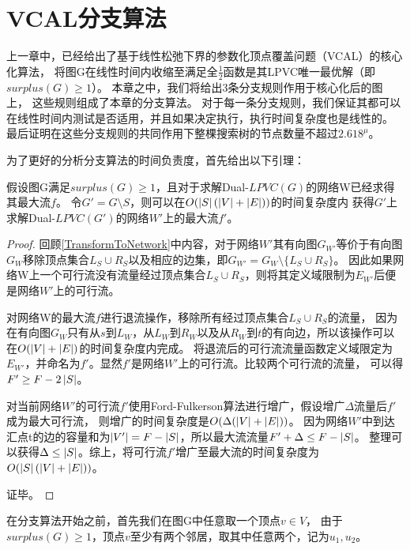 \section{VCAL分支算法}
上一章中，已经给出了基于线性松弛下界的参数化顶点覆盖问题（VCAL）的核心化算法，
将图G在线性时间内收缩至满足全$\frac{1}{2}$函数是其LPVC唯一最优解（即$surplus(G) \ge 1$）。
本章之中，我们将给出3条分支规则作用于核心化后的图上，
这些规则组成了本章的分支算法。
对于每一条分支规则，我们保证其都可以在线性时间内测试是否适用，并且如果决定执行，执行时间复杂度也是线性的。
最后证明在这些分支规则的共同作用下整棵搜索树的节点数量不超过$2.618^\mu$。

\vspace{0.5cm}
为了更好的分析分支算法的时间负责度，首先给出以下引理：
\begin{lemma} \label{LemmaUpdateMaxflow}
假设图G满足$surplus(G) \ge 1$，且对于求解Dual-$LPVC(G)$的网络W已经求得其最大流$f$。
令$G' = G \setminus S$，则可以在$O(\left\vert S \right\vert(\left\vert V \right\vert + \left\vert E \right\vert))$的时间复杂度内
获得$G'$上求解Dual-$LPVC(G')$的网络$W'$上的最大流$f'$。
\end{lemma}

\begin{proof}
回顾\ref{TransformToNetwork}中内容，对于网络$W'$其有向图$G_{W'}$等价于有向图$G_W$移除顶点集合$L_S \cup R_S$以及相应的边集，即$G_{W'} = G_W \setminus \{L_S \cup R_S\}$。
因此如果网络W上一个可行流没有流量经过顶点集合$L_S \cup R_S$，则将其定义域限制为$E_{W'}$后便是网络$W'$上的可行流。

对网络W的最大流$f$进行退流操作，移除所有经过顶点集合$L_S \cup R_S$的流量，
因为在有向图$G_W$只有从$s$到$L_W$，从$L_W$到$R_W$以及从$R_W$到$t$的有向边，所以该操作可以在$O(\left\vert V \right\vert + \left\vert E \right\vert)$的时间复杂度内完成。
将退流后的可行流流量函数定义域限定为$E_{W'}$，并命名为$f'$。显然$f'$是网络$W'$上的可行流。比较两个可行流的流量，
可以得$F' \ge F - 2 \left\vert S \right\vert$。

对当前网络$W'$的可行流$f'$使用Ford-Fulkerson算法进行增广，假设增广$\Delta$流量后$f'$成为最大可行流，
则增广的时间复杂度是$O(\Delta(\left\vert V \right\vert + \left\vert E \right\vert))$。
因为网络$W'$中到达汇点t的边的容量和为$\left\vert V' \right\vert = F - \left\vert S \right\vert$，所以最大流流量$F' + \Delta \le F - \left\vert S \right\vert$。
整理可以获得$\Delta \le \left\vert S \right\vert$。综上，将可行流$f'$增广至最大流的时间复杂度为$O(\left\vert S \right\vert(\left\vert V \right\vert + \left\vert E \right\vert))$。

证毕。
\end{proof}

在分支算法开始之前，首先我们在图G中任意取一个顶点$v \in V$，
由于$surplus(G) \ge 1$，顶点$v$至少有两个邻居，取其中任意两个，记为$u_1, u_2$。



